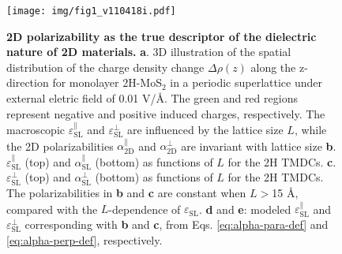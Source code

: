 \documentclass[journal=ancac3,manuscript=article,email=true,hyperref=true,keywords=false]{achemso}
\begin{document}
\label{sec:org34cbe74}
\begin{figure}[H]
\centering
\texttt{[image: img/fig1\_v110418i.pdf]}
\caption{\label{fig-1} \textbf{2D polarizability as the true
    descriptor of the dielectric nature of 2D materials.}
  \textbf{a}. 3D illustration of the spatial distribution of the
  charge density change $\Delta \rho(z)$ along the z-direction for
  monolayer 2H-MoS$_{2}$ in a periodic superlattice under external
  eletric field of 0.01 V/\AA{}.  The green and red regions represent
  negative and positive induced charges, respectively. The macroscopic
  $\varepsilon_{\mathrm{SL}}^{\parallel}$ and
  $\varepsilon_{\mathrm{SL}}^{\perp}$ are influenced by the lattice
  size $L$, while the 2D polarizabilities $\alpha_{\mathrm{2D}}^{\parallel}$ and
  $\alpha_{\mathrm{2D}}^{\perp}$ are invariant with lattice size \textbf{b}.
  $\varepsilon^{\parallel}_{\mathrm{SL}}$ (top) and
  $\alpha_{\mathrm{SL}}^{\parallel}$ (bottom) as functions of $L$ for
  the 2H TMDCs. \textbf{c}.  $\varepsilon^{\perp}_{\mathrm{SL}}$ (top)
  and $\alpha_{\mathrm{SL}}^{\perp}$ (bottom) as functions of $L$ for
  the 2H TMDCs. The polarizabilities in \textbf{b} and \textbf{c} are
  constant when $L>$15 \AA{}, compared with the $L$-dependence of
  $\varepsilon_{\mathrm{SL}}$. \textbf{d} and \textbf{e}: modeled
  $\varepsilon_{\mathrm{SL}}^{\parallel}$ and
  $\varepsilon_{\mathrm{SL}}^{\perp}$ corresponding with \textbf{b}
  and \textbf{c}, from Eqs. \ref{eq:alpha-para-def} and
  \ref{eq:alpha-perp-def}, respectively.}
\end{figure}

\end{document}
